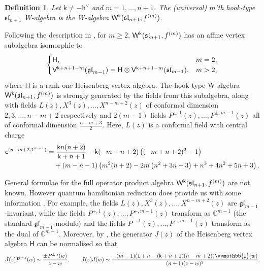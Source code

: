 \documentclass[10pt,a4paper]{amsart}
\numberwithin{equation}{section}
\newcommand{\cc}{\mathsf{c}}   %
\newcommand{\kk}{\mathsf{k}}   %
\newcommand{\wun}{\vvmathbb{1}}  %
\DeclarePairedDelimiter{\brac}{\lparen}{\rparen}   %
\newcommand{\fld}[1]{\mathbb{#1}}    %
\newcommand{\alg}[1]{\mathfrak{#1}}  %
\newcommand{\VOA}[1]{\mathsf{#1}}    %
\newcommand{\CC}{\fld{C}}
\newcommand{\SLA}[2]{\alg{#1}_{#2}}                      %
\newcommand{\slnpone}{\SLA{sl}{n+1}}
\newcommand{\cox}{\mathsf{h}}                                        %
\newcommand{\dcox}{\coroot{\cox}}                                    %
\newcommand{\coroot}[1]{#1^{\vee}}                                   %
\newcommand{\fhook}[1]{f^{(#1)}}                                  %
\newcommand{\Wsymb}{\VOA{W}}
\newcommand{\uaffvoa}[2]{\VOA{V}^{#1}\brac{#2}}                   %
\newcommand{\uQHR}[3]{\Wsymb^{#1}\brac{#2,#3}}                    %
\theoremstyle{plain}
\newtheorem{definition}[theorem]{Definition}
\begin{document}
\begin{definition} \label{def:hook}
Let $\kk \neq -\dcox$ and $m = 1, \dots, n+1$. The  (universal) $m$'th \emph{hook-type $\slnpone$ W-algebra} is the W-algebra $\uQHR{\kk}{\slnpone}{\fhook{m}}$.
\end{definition}

Following the description in \cite{CreTri22}, for $m\geq 2$, $\uQHR{\kk}{\slnpone}{\fhook{m}}$ has an affine vertex subalgebra isomorphic to
%
\begin{equation}
    \begin{cases}
        \VOA{H}, & m=2,\\
        \uaffvoa{\kk+n+1-m}{\mathfrak{gl}_{m-1}} = \VOA{H} \otimes \uaffvoa{\kk+n+1-m}{\mathfrak{sl}_{m-1}}, & m>2,
    \end{cases}
\end{equation}
%
where $\VOA{H}$ is a rank one Heisenberg vertex algebra. The hook-type W-algebra $\uQHR{\kk}{\slnpone}{\fhook{m}}$ is strongly generated by the fields from this subalgebra, along with fields $L(z), X^3(z),\dots,X^{n-m+2}(z)$ of conformal dimension $2,3, \dots, n-m+2$ respectively and $2(m-1)$ fields $P^{\pm, 1}(z), \dots, P^{\pm, m-1}(z)$ all of conformal dimension $\frac{n-m+3}{2}$. Here, $L(z)$ is a conformal field with central charge
%
\begin{align} \label{eq:hookcc}
    \cc^{(n-m+2,1^{m-1})} =&\ \frac{\kk n (n+2)}{\kk+n+1}-\kk (-m+n+2) \left((-m+n+2)^2-1\right)\\
        &+(m-n-1) \left(m^2 (n+2)-2 m \left(n^2+3 n+3\right)+n^3+4 n^2+5 n+3\right). \notag
\end{align}

General formulae for the full operator product algebra $\uQHR{\kk}{\slnpone}{\fhook{m}}$ are not known. However quantum hamiltonian reduction does provide us with some information \cite{KacQua04}. For example, the fields $L(z), X^3(z),\dots,X^{n-m+2}(z)$ are $\mathfrak{gl}_{m-1}$-invariant, while the fields $P^{+, 1}(z), \dots, P^{+, m-1}(z)$ transform as $\CC^{m-1}$ (the standard $\mathfrak{gl}_{m-1}$-module) and the fields $P^{-, 1}(z), \dots, P^{-, m-1}(z)$ transform as the dual of $\CC^{m-1}$. Moreover, by \cite[Lem.~3.4]{CreTri22}, the generator $J(z)$ of the Heisenberg vertex algebra $\VOA{H}$ can be normalised so that 
%
\begin{equation} \label{eq:JPOPE}
    J(z) P^{\pm, i}(w) \sim \frac{\pm  P^{\pm, i}(w)}{z-w}, \qquad J(z) J(w) \sim \frac{-(m-1) (1 + n - (\kk+n+1) (n- m +2)) \wun(w)}{(n + 1)(z-w)^2}.
\end{equation}
\end{document}
